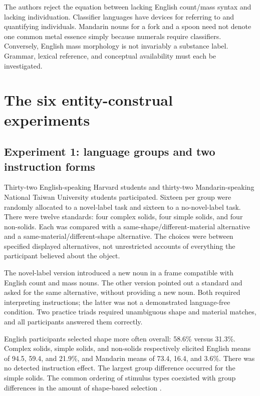 The authors reject the equation between lacking English count/mass syntax
and lacking individuation. Classifier languages have devices for referring
to and quantifying individuals. Mandarin nouns for a fork and a spoon
need not denote one common metal essence simply because numerals require
classifiers. Conversely, English mass morphology is not invariably a
substance label. Grammar, lexical reference, and conceptual availability
must each be investigated.

\section{The six entity-construal experiments}
\label{sec:p19-lc-entity-experiments}

\subsection{Experiment 1: language groups and two instruction forms}

Thirty-two English-speaking Harvard students and thirty-two Mandarin-speaking
National Taiwan University students participated. Sixteen per group were
randomly allocated to a novel-label task and sixteen to a no-novel-label
task. There were twelve standards: four complex solids, four simple solids,
and four non-solids. Each was compared with a same-shape/different-material
alternative and a same-material/different-shape alternative. The choices
were between specified displayed alternatives, not unrestricted accounts
of everything the participant believed about the object.

The novel-label version introduced a new noun in a frame compatible with
English count and mass nouns. The other version pointed out a standard and
asked for the same alternative, without providing a new noun. Both required
interpreting instructions; the latter was not a demonstrated language-free
condition. Two practice triads required unambiguous shape and material
matches, and all participants answered them correctly.

English participants selected shape more often overall: 58.6\% versus
31.3\%. Complex solids, simple solids, and non-solids respectively
elicited English means of 94.5, 59.4, and 21.9\%, and Mandarin means
of 73.4, 16.4, and 3.6\%. There was no detected instruction effect.
The largest group difference occurred for the simple solids. The common
ordering of stimulus types coexisted with group differences in the amount
of shape-based selection
\cite[pp.~492--496,Table~1,Fig.~1]{LiDunhamCarey2009SubstanceLC}.

